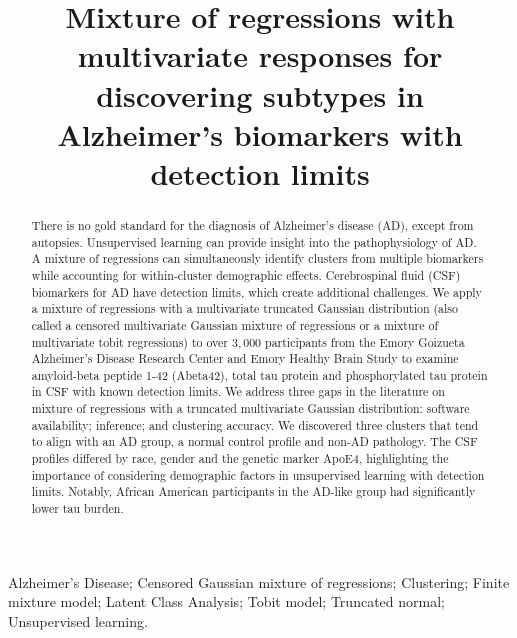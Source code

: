 \documentclass{interact}
\newif\ifblind
\theoremstyle{plain}
\theoremstyle{definition}
\theoremstyle{remark}
\begin{document}
\title{Mixture of regressions with multivariate responses for discovering subtypes in Alzheimer's biomarkers with detection limits}

\date{}

\ifblind
\author{Blinded}
\else
\author{
}
\fi

\maketitle


\begin{abstract}
There is no gold standard for the diagnosis of Alzheimer's disease (AD), except from autopsies. Unsupervised learning can provide insight into the pathophysiology of AD. A mixture of regressions can simultaneously identify clusters from multiple biomarkers while accounting for within-cluster demographic effects. Cerebrospinal fluid (CSF) biomarkers for AD have detection limits, which create additional challenges. We apply a mixture of regressions with a multivariate truncated Gaussian distribution (also called a censored multivariate Gaussian mixture of regressions or a mixture of multivariate tobit regressions) to over $3,\!000$ participants from the Emory Goizueta Alzheimer's Disease Research Center and Emory Healthy Brain Study to examine amyloid-beta peptide 1-42 (Abeta42), total tau protein and phosphorylated tau protein in CSF with known detection limits. We address three gaps in the literature on mixture of regressions with a truncated multivariate Gaussian distribution: software availability; inference; and clustering accuracy. We discovered three clusters that tend to align with an AD group, a normal control profile and non-AD pathology. The CSF profiles differed by race, gender and the genetic marker ApoE4, highlighting the importance of considering demographic factors in unsupervised learning with detection limits. Notably, African American participants in the AD-like group had significantly lower tau burden.
\end{abstract}

\begin{keywords}
Alzheimer’s Disease; Censored Gaussian mixture of regressions; Clustering; Finite mixture model; Latent Class Analysis; Tobit model; Truncated normal; Unsupervised learning.
\end{keywords}
\end{document}
